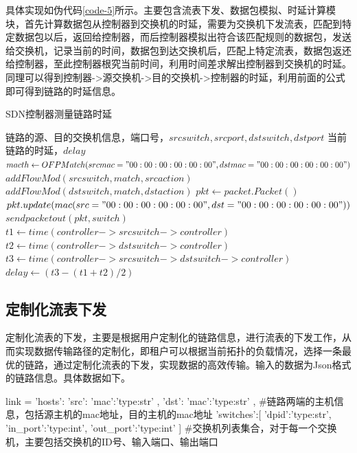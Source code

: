 具体实现如伪代码\ref{code-5}所示。主要包含流表下发、数据包模拟、时延计算模块，首先计算数据包从控制器到交换机的时延，需要为交换机下发流表，匹配到特定数据包以后，返回给控制器，而后控制器模拟出符合该匹配规则的数据包，发送给交换机，记录当前的时间，数据包到达交换机后，匹配上特定流表，数据包返还给控制器，至此控制器根究当前时间，利用时间差求解出控制器到交换机的时延。同理可以得到控制器->源交换机->目的交换机->控制器的时延，利用前面的公式即可得到链路的时延信息。

\begin{algorithm}[!htb]
    \caption{SDN控制器测量链路时延}
    \label{code-5}
    \begin{algorithmic}[1] %
        \Require 链路的源、目的交换机信息，端口号，$srcswitch,srcport,dstswitch,dstport$
        \Ensure 当前链路的时延，$delay$
        	\State $macth \gets OFPMatch(srcmac="00:00:00:00:00:00",dstmac="00:00:00:00:00:00")$
        	\State $addFlowMod(srcswitch,match,srcaction)$
        	\State $addFlowMod(dstswitch,match,dstaction)$
        \EndFunction
        	\State $pkt \gets packet.Packet()$
        	\State $pkt.update(mac(src="00:00:00:00:00:00",dst="00:00:00:00:00:00"))$
        	\State $sendpacketout(pkt, switch)$
        \EndFunction
         	\State $t1 \gets time(controller->srcswitch->controller)$
         	\State $t2 \gets time(controller->dstswitch->controller)$
         	\State $t3 \gets time(controller->srcswitch->dstswitch->controller)$
         	\State $delay \gets (t3-(t1+t2)/2)$
         	\State {}
        \EndFunction
    \end{algorithmic}
\end{algorithm}

\subsection{定制化流表下发}
定制化流表的下发，主要是根据用户定制化的链路信息，进行流表的下发工作，从而实现数据传输路径的定制化，即租户可以根据当前拓扑的负载情况，选择一条最优的链路，通过定制化流表的下发，实现数据的高效传输。输入的数据为Json格式的链路信息。具体数据如下。

\begin{python} 
link = {
	'hosts':{
		'src':{
			'mac':'type:str'
		},
		'dst':{
			'mac':'type:str'
		}
	}, #链路两端的主机信息，包括源主机的mac地址，目的主机的mac地址
	'switches':[
		{
			'dpid':'type:str',
			'in_port':'type:int',
			'out_port':'type:int'
		}
	] #交换机列表集合，对于每一个交换机，主要包括交换机的ID号、输入端口、输出端口
}
\end{python}

